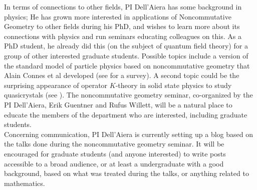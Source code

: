 \documentclass[11pt]{article}
\begin{document}
In terms of connections to other fields, PI Dell'Aiera has some background in physics; %
He has grown more interested in applications of Noncommutative Geometry to other fields during his PhD, and wishes to learn more about its connections with physics and run seminars educating colleagues on this.  As a PhD student, he already did this (on the subject of quantum field theory) for a group of other interested graduate students.  Possible topics include a version of the standard model of particle physics based on noncommutative geometry that  Alain Connes et al developed (see \cite{ChamseddineConnes} for a survey). A second topic could be the surprising appearance of operator $K$-theory in solid state physics to study quasicrystals (see \cite{Bellissard}). The noncommutative geometry seminar, co-organized by the PI Dell'Aiera, Erik Guentner and Rufus Willett, will be a natural place to educate the members of the department who are interested, including graduate students.\\

Concerning communication, PI Dell'Aiera is currently setting up a blog based on the talks done during the noncommutative geometry seminar. It will be encouraged for graduate students (and anyone interested) to write posts accessible to a broad audience, or at least a undergraduate with a good background, based on what was treated during the talks, or anything related to mathematics.\\

\pagebreak

\end{document}
